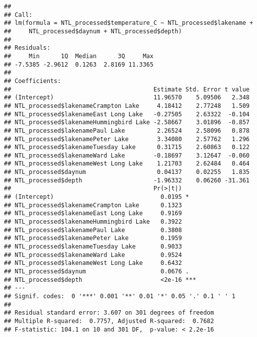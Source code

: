 \documentclass[]{article}
\newenvironment{Shaded}{\begin{snugshade}}{\end{snugshade}}
\newcommand{\KeywordTok}[1]{\textcolor[rgb]{0.13,0.29,0.53}{\textbf{#1}}}
\newcommand{\DecValTok}[1]{\textcolor[rgb]{0.00,0.00,0.81}{#1}}
\newcommand{\StringTok}[1]{\textcolor[rgb]{0.31,0.60,0.02}{#1}}
\newcommand{\OperatorTok}[1]{\textcolor[rgb]{0.81,0.36,0.00}{\textbf{#1}}}
\newcommand{\NormalTok}[1]{#1}
\begin{document}
\begin{Shaded}
\end{Shaded}

\begin{verbatim}
## 
## Call:
## lm(formula = NTL_processed$temperature_C ~ NTL_processed$lakename + 
##     NTL_processed$daynum + NTL_processed$depth)
## 
## Residuals:
##     Min      1Q  Median      3Q     Max 
## -7.5385 -2.9612  0.1263  2.8169 11.3365 
## 
## Coefficients:
##                                        Estimate Std. Error t value
## (Intercept)                            11.96570    5.09506   2.348
## NTL_processed$lakenameCrampton Lake     4.18412    2.77248   1.509
## NTL_processed$lakenameEast Long Lake   -0.27505    2.63322  -0.104
## NTL_processed$lakenameHummingbird Lake -2.58667    3.01896  -0.857
## NTL_processed$lakenamePaul Lake         2.26524    2.58096   0.878
## NTL_processed$lakenamePeter Lake        3.34080    2.57762   1.296
## NTL_processed$lakenameTuesday Lake      0.31715    2.60863   0.122
## NTL_processed$lakenameWard Lake        -0.18697    3.12647  -0.060
## NTL_processed$lakenameWest Long Lake    1.21703    2.62484   0.464
## NTL_processed$daynum                    0.04137    0.02255   1.835
## NTL_processed$depth                    -1.96332    0.06260 -31.361
##                                        Pr(>|t|)    
## (Intercept)                              0.0195 *  
## NTL_processed$lakenameCrampton Lake      0.1323    
## NTL_processed$lakenameEast Long Lake     0.9169    
## NTL_processed$lakenameHummingbird Lake   0.3922    
## NTL_processed$lakenamePaul Lake          0.3808    
## NTL_processed$lakenamePeter Lake         0.1959    
## NTL_processed$lakenameTuesday Lake       0.9033    
## NTL_processed$lakenameWard Lake          0.9524    
## NTL_processed$lakenameWest Long Lake     0.6432    
## NTL_processed$daynum                     0.0676 .  
## NTL_processed$depth                      <2e-16 ***
## ---
## Signif. codes:  0 '***' 0.001 '**' 0.01 '*' 0.05 '.' 0.1 ' ' 1
## 
## Residual standard error: 3.607 on 301 degrees of freedom
## Multiple R-squared:  0.7757, Adjusted R-squared:  0.7682 
## F-statistic: 104.1 on 10 and 301 DF,  p-value: < 2.2e-16
\end{verbatim}
\end{document}
